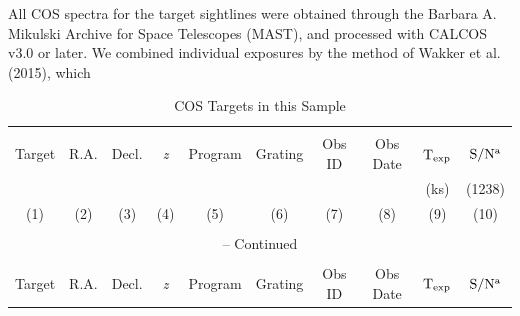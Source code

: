 All COS spectra for the target sightlines were obtained through the Barbara A. Mikulski Archive for Space Telescopes (MAST), and processed with CALCOS v3.0 or later. We combined individual exposures by the method of Wakker et al. (2015), which
\begin{landscape}

\renewcommand{\thefootnote}{\alph{footnote}}

\scriptsize
\begin{center}
\begin{longtable}{l l l l l l l l l l}
\caption[COS Targets in this Sample]{COS Targets in this Sample} \label{table1} \\

\hline \hline \\[-2ex]
  \multicolumn{1}{c}{Target} & 
  \multicolumn{1}{c}{R.A.} &
  \multicolumn{1}{c}{Decl.} &
  \multicolumn{1}{c}{\textit{z}} &
  \multicolumn{1}{c}{Program} &
  \multicolumn{1}{c}{Grating} &
  \multicolumn{1}{c}{Obs ID} &
  \multicolumn{1}{c}{Obs Date} &
  \multicolumn{1}{c}{$\rm T_{exp}$\tablenotemark{a}} &
  \multicolumn{1}{c}{$\rm S/N^a$}  \\
  
  \multicolumn{1}{c}{} & 
  \multicolumn{1}{c}{} &
  \multicolumn{1}{c}{} &
  \multicolumn{1}{c}{} &
  \multicolumn{1}{c}{} &
  \multicolumn{1}{c}{} &
  \multicolumn{1}{c}{} &
  \multicolumn{1}{c}{} &
  \multicolumn{1}{c}{(ks)} &
  \multicolumn{1}{c}{(1238)} \\
  
  \multicolumn{1}{c}{(1)} & 
  \multicolumn{1}{c}{(2)} &
  \multicolumn{1}{c}{(3)} &
  \multicolumn{1}{c}{(4)} &
  \multicolumn{1}{c}{(5)} &
  \multicolumn{1}{c}{(6)} &
  \multicolumn{1}{c}{(7)} &
  \multicolumn{1}{c}{(8)} &
  \multicolumn{1}{c}{(9)} &
  \multicolumn{1}{c}{(10)} \\[0.5ex] \hline \\[-1.8ex]
\endfirsthead

\multicolumn{10}{c}{{\tablename} \thetable{} -- Continued} \\[0.5ex]
\hline \hline \\[-2ex]
  \multicolumn{1}{c}{Target} & 
  \multicolumn{1}{c}{R.A.} &
  \multicolumn{1}{c}{Decl.} &
  \multicolumn{1}{c}{\textit{z}} &
  \multicolumn{1}{c}{Program} &
  \multicolumn{1}{c}{Grating} &
  \multicolumn{1}{c}{Obs ID} &
  \multicolumn{1}{c}{Obs Date} &
  \multicolumn{1}{c}{$\rm T_{exp}$\tablenotemark{a}} &
  \multicolumn{1}{c}{$\rm S/N^a$}  \\
  

\end{longtable}
\end{center}
\end{landscape}
